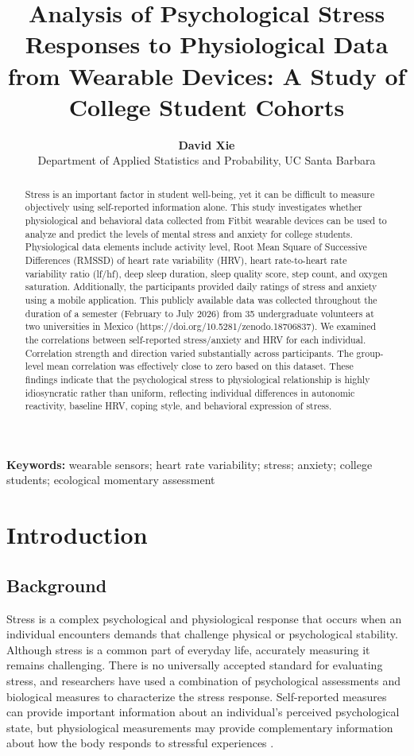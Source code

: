 \documentclass[11pt, a4paper, oneside]{article}
\title{\textbf{Analysis of Psychological Stress Responses to Physiological Data from Wearable Devices: A Study of College Student Cohorts}}
\author{\textbf{David Xie} \\ Department of Applied Statistics and Probability, UC Santa Barbara}
\begin{document}
\maketitle %

\begin{abstract}
Stress is an important factor in student well-being, yet it can be difficult to measure objectively using self-reported information alone. This study investigates whether physiological and behavioral data collected from Fitbit wearable devices can be used to analyze and predict the levels of mental stress and anxiety for college students. Physiological data elements include activity level, Root Mean Square of Successive Differences (RMSSD) of heart rate variability (HRV), heart rate-to-heart rate variability ratio (lf/hf), deep sleep duration, sleep quality score, step count, and oxygen saturation. Additionally, the participants provided daily ratings of stress and anxiety using a mobile application. This publicly available data was collected throughout the duration of a semester (February to July 2026) from 35 undergraduate volunteers at two universities in Mexico (https://doi.org/10.5281/zenodo.18706837). We examined the correlations between self-reported stress/anxiety and HRV for each individual. Correlation strength and direction varied substantially across participants. The group-level mean correlation was effectively close to zero based on this dataset. These findings indicate that the psychological stress to physiological relationship is highly idiosyncratic rather than uniform, reflecting individual differences in autonomic reactivity, baseline HRV, coping style, and behavioral expression of stress.
\end{abstract}

\textbf{Keywords:} wearable sensors; heart rate variability; stress; anxiety; college students; ecological momentary assessment

\section{Introduction}

\subsection{Background}
Stress is a complex psychological and physiological response that occurs when an individual encounters demands that challenge physical or psychological stability. Although stress is a common part of everyday life, accurately measuring it remains challenging. There is no universally accepted standard for evaluating stress, and researchers have used a combination of psychological assessments and biological measures to characterize the stress response. Self-reported measures can provide important information about an individual's perceived psychological state, but physiological measurements may provide complementary information about how the body responds to stressful experiences \cite{reference 1}.
\end{document}
